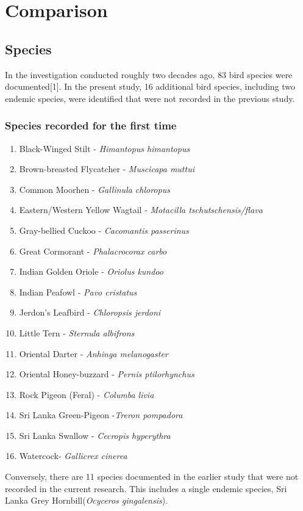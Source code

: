 \chapter{Comparison}
\label{cp:Comparative}
\section{Species}
In the investigation conducted roughly two decades ago, 83 bird species were documented[1]. In the present study, 16 additional bird species, including two endemic species, were identified that were not recorded in the previous study.

\begin{importantbox}
\subsection{Species recorded for the first time}
\begin{enumerate}
    \item Black-Winged Stilt - \textit{Himantopus himantopus}
    \item Brown-breasted Flycatcher - \textit{Muscicapa muttui}
    \item Common Moorhen - \textit{Gallinula chloropus}
    \item Eastern/Western Yellow Wagtail - \textit{Motacilla tschutschensis/flava}
    \item Gray-bellied Cuckoo - \textit{Cacomantis passerinus}
    \item Great Cormorant - \textit{Phalacrocorax carbo}
    \item Indian Golden Oriole - \textit{Oriolus kundoo}
    \item Indian Peafowl - \textit{Pavo cristatus}
    \item Jerdon's Leafbird - \textit{Chloropsis jerdoni}
    \item Little Tern - \textit{Sternula albifrons}
    \item Oriental Darter - \textit{Anhinga melanogaster}
    \item Oriental Honey-buzzard - \textit{Pernis ptilorhynchus}
    \item Rock Pigeon (Feral) - \textit{Columba livia}
    \item Sri Lanka Green-Pigeon -\textit{Treron pompadora}
    \item Sri Lanka Swallow - \textit{Cecropis hyperythra}
    \item Watercock- \textit{Gallicrex cinerea}
\end{enumerate}
\end{importantbox}

Conversely, there are 11 species documented in the earlier study that were not recorded in the current research. This includes a single endemic species, Sri Lanka Grey Hornbill(\textit{Ocyceros gingalensis}).
